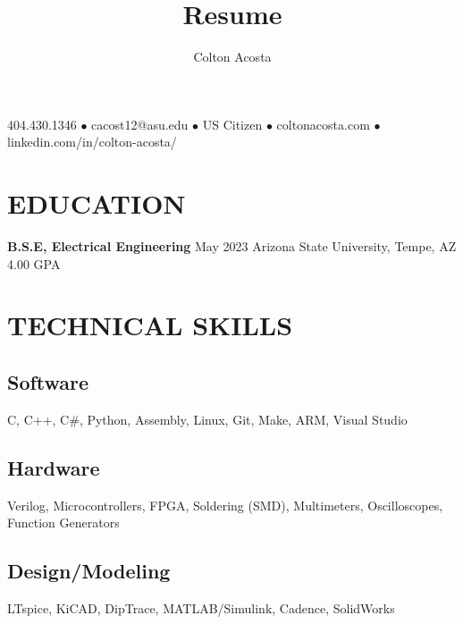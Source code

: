 \documentclass{article}
\makeatletter
\renewcommand{\maketitle}{
	\begin{center}
		{\huge\bfseries
			\theauthor}
			
		404.430.1346 $\bullet$ cacost12@asu.edu $\bullet$ US Citizen $\bullet$ coltonacosta.com $\bullet$ linkedin.com/in/colton-acosta/
	\end{center}
}
\makeatother
\begin{document}
\title{Resume}
\author{Colton Acosta}
\maketitle
\section{EDUCATION}
\textbf{B.S.E, Electrical Engineering}
\hfill 
May 2023
\linebreak
Arizona State University, Tempe, AZ 
\hfill
4.00 GPA

\section{TECHNICAL SKILLS}
\subsection{Software} 
C, C++, C\#, Python, Assembly, Linux, Git, Make, ARM, Visual Studio 
\subsection{Hardware}
Verilog, Microcontrollers, FPGA, Soldering (SMD), Multimeters, Oscilloscopes, Function Generators 
\subsection{Design/Modeling}
LTspice, KiCAD, DipTrace, MATLAB/Simulink, Cadence, SolidWorks
\end{document}
